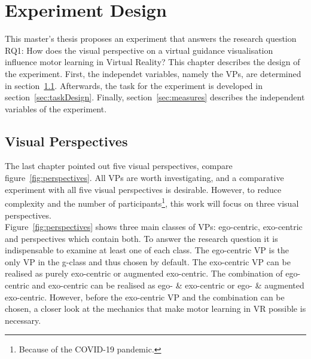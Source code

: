 \chapter{Experiment Design}
\label{chapter:studysetting_conduction}
This master's thesis proposes an experiment that answers the research question RQ1: How does the visual perspective on a virtual guidance visualisation influence motor learning in Virtual Reality? This chapter describes the design of the experiment. First, the independet variables, namely the VPs, are determined in section~\ref{sec:visualPerspecticves}. Afterwards, the task for the experiment is developed in section~\ref{sec:taskDesign}. Finally, section~\ref{sec:measures} describes the independent variables of the experiment.

\section{Visual Perspectives}
\label{sec:visualPerspecticves}
The last chapter pointed out five visual perspectives, compare figure~\ref{fig:perspectives}. All VPs are worth investigating, and a comparative experiment with all five visual perspectives is desirable. However, to reduce complexity and the number of participants\footnote{Because of the COVID-19 pandemic.}, this work will focus on three visual perspectives.\\
Figure~\ref{fig:perspectives} shows three main classes of VPs: ego-centric, exo-centric and perspectives which contain both. To answer the research question it is indispensable to examine at least one of each class. The ego-centric VP is the only VP in the g-class and thus chosen by default. The exo-centric VP can be realised as purely exo-centric or augmented exo-centric. The combination of ego-centric and exo-centric can be realised as ego- \& exo-centric or ego- \& augmented exo-centric. However, before the exo-centric VP and the combination can be chosen, a closer look at the mechanics that make motor learning in VR possible is necessary.

